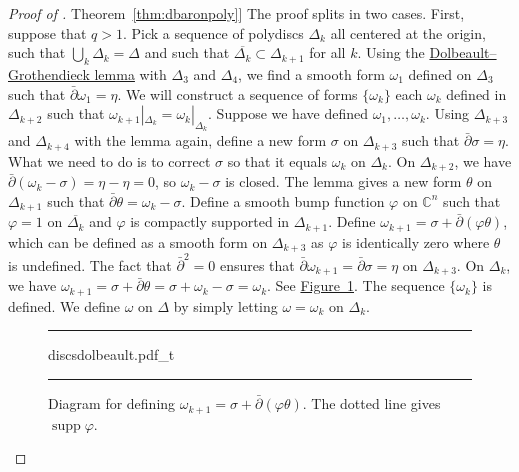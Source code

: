 \documentclass[12pt,openany]{book}
\newcommand{\supp}{\operatorname{supp}}
\newcommand{\C}{{\mathbb{C}}}
\theoremstyle{plain}
\theoremstyle{remark}
\theoremstyle{definition}
\newenvironment{myfig}{%
\begin{figure}[h!t]
\noindent\rule{\textwidth}{0.5pt}\vspace{12pt}\par\centering}%
{\par\noindent\rule{\textwidth}{0.5pt}
\end{figure}}
\theoremstyle{exercise}
\theoremstyle{example}
\newcommand{\figureref}[1]{\hyperref[#1]{Figure~\ref*{#1}}}
\newcommand{\thmref}[1]{\hyperref[#1]{Theorem~\ref*{#1}}}
\begin{document}
\begin{proof}[Proof of \thmref{thm:dbaronpoly}]
The proof splits in two cases.  First, suppose that $q > 1$.
Pick a sequence of polydiscs $\Delta_k$ all centered at the origin,
such that $\bigcup_k \Delta_k = \Delta$ and such that $\overline{\Delta_k}
\subset \Delta_{k+1}$ for all $k$.
Using the
\hyperref[lemma:dolgro]{Dolbeault--Grothendieck lemma} with $\Delta_3$ and
$\Delta_4$, we find a smooth form $\omega_1$ defined on
$\Delta_3$ such that $\bar{\partial} \omega_1 = \eta$.
We will construct a sequence of forms $\{ \omega_k \}$
each $\omega_k$ defined in $\Delta_{k+2}$
such that $\omega_{k+1}|_{\Delta_k} = \omega_k|_{\Delta_k}$.
Suppose we have defined $\omega_1,\ldots,\omega_k$.
Using $\Delta_{k+3}$ and $\Delta_{k+4}$ with the lemma again,
define a new form $\sigma$ on $\Delta_{k+3}$ such that $\bar{\partial}
\sigma = \eta$.  What we need to do is to correct $\sigma$ so that it equals
$\omega_k$ on $\Delta_k$.  On $\Delta_{k+2}$, we have
$\bar{\partial}(\omega_k-\sigma) = \eta-\eta = 0$, so $\omega_k-\sigma$
is closed.  The lemma gives a new form $\theta$ on $\Delta_{k+1}$ such that
$\bar{\partial}\theta = \omega_k-\sigma$.
Define a smooth bump function $\varphi$ on $\C^n$ such that $\varphi=1$ on
$\overline{\Delta_{k}}$ and $\varphi$ is compactly supported in
$\Delta_{k+1}$.  Define
$\omega_{k+1} = \sigma + \bar{\partial}(\varphi \theta)$, which can be
defined as a smooth form on $\Delta_{k+3}$ as $\varphi$ is identically zero
where $\theta$ is undefined.  The fact that
$\bar{\partial}^2=0$ ensures that $\bar{\partial}\omega_{k+1} =
\bar{\partial} \sigma = \eta$ on $\Delta_{k+3}$.  On $\Delta_k$, we have
$\omega_{k+1} = \sigma + \bar{\partial}\theta = \sigma+\omega_k-\sigma=\omega_k$.
See \figureref{fig:discsdolbeault}.
The sequence $\{ \omega_k \}$ is defined.
We define $\omega$ on $\Delta$ by simply letting $\omega =
\omega_k$ on $\Delta_k$.

\begin{myfig}
{discsdolbeault.pdf_t}
\caption{Diagram for defining $\omega_{k+1}=\sigma + \bar{\partial}(\varphi \theta)$.
The dotted line gives $\supp \varphi$.\label{fig:discsdolbeault}}
\end{myfig}


\end{proof}
\end{document}
